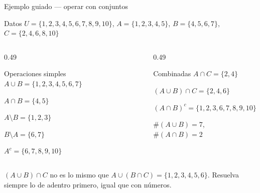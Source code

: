 \documentclass[aspectratio=169,10pt]{beamer}
\begin{document}
\begin{frame}{Ejemplo guiado — operar con conjuntos}
  \scriptsize
  \begin{block}{Datos}
    \tiny
    $U=\{1,2,3,4,5,6,7,8,9,10\}$, \quad
    $A=\{1,2,3,4,5\}$, \quad
    $B=\{4,5,6,7\}$, \quad
    $C=\{2,4,6,8,10\}$
  \end{block}

  \vspace{0.08cm}
  \begin{columns}[T,onlytextwidth]
    \begin{column}{0.49\textwidth}
      \begin{exampleblock}{Operaciones simples}
        \tiny
        $A\cup B = \{1,2,3,4,5,6,7\}$

        $A\cap B = \{4,5\}$

        $A\setminus B = \{1,2,3\}$

        $B\setminus A = \{6,7\}$

        $A^{c} = \{6,7,8,9,10\}$
      \end{exampleblock}
    \end{column}
    \begin{column}{0.49\textwidth}
      \begin{exampleblock}{Combinadas}
        \tiny
        $A\cap C = \{2,4\}$

        $(A\cup B)\cap C = \{2,4,6\}$

        $(A\cap B)^{c} = \{1,2,3,6,7,8,9,10\}$

        $\#(A\cup B) = 7$, \ $\#(A\cap B)=2$
      \end{exampleblock}
    \end{column}
  \end{columns}

  \vspace{0.08cm}
  {\tiny\color{uniGris} 
  $(A\cup B)\cap C$ no es lo mismo que $A\cup(B\cap C) = \{1,2,3,4,5,6\}$.
  Resuelva siempre lo de adentro primero, igual que con números.}
\end{frame}
\end{document}
